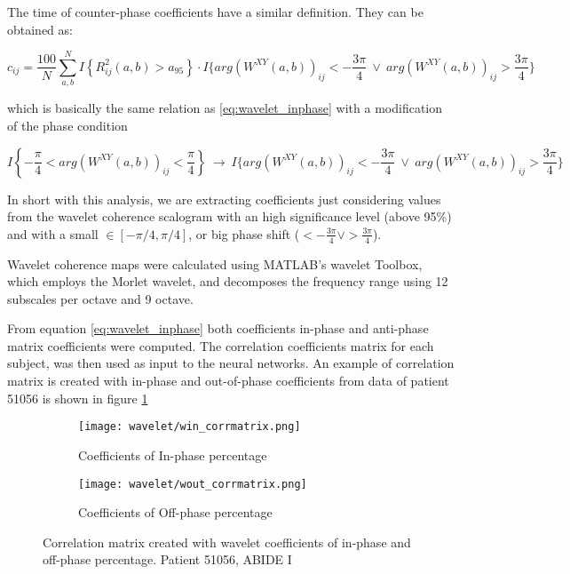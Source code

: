 \documentclass[11pt]{report}
\begin{document}
The time of counter-phase coefficients have a similar definition. They can be obtained as:

\begin{equation} \label{eq:wavelet_counterphase}
c_{ij} = \frac{100}{N}\sum_{a, b}^N I\left\{ R_{ij}^2(a,b) > a_{95}\right\} \cdot I\{arg(W^{XY}(a, b))_{ij} < -\frac{3\pi}{4} \ \lor \ arg (W^{XY}(a, b))_{ij} >\frac{3\pi}{4} \}
\end{equation}

which is basically the same relation as \ref{eq:wavelet_inphase} with a modification of the phase condition

\[
I\left\{-\frac{\pi}{4}<arg(W^{XY}(a, b))_{ij} < \frac{\pi}{4}  \right\} \ \longrightarrow \ I\{arg(W^{XY}(a, b))_{ij} < -\frac{3\pi}{4} \ \lor \ arg (W^{XY}(a, b))_{ij} >\frac{3\pi}{4} \}
\]

\hfill

\noindent In short with this analysis, we are extracting coefficients just considering values from the wavelet coherence scalogram with an high significance level (above 95\%) and with a small $\in [-\pi/4, \pi/4]$, or big phase shift ($< -\frac{3\pi}{4}  \lor  >\frac{3 \pi}{4}$).

Wavelet coherence maps were calculated using MATLAB's wavelet Toolbox, which employs the Morlet wavelet, and decomposes the frequency range using 12 subscales per octave and 9 octave.


From equation \ref{eq:wavelet_inphase} both coefficients in-phase and anti-phase matrix coefficients were computed.
The correlation coefficients matrix for each subject, was then used as input to the neural networks.
An example of correlation matrix is created with in-phase and out-of-phase coefficients from data of patient 51056 is shown in figure \ref{fig:win_wout}



\begin{figure}
\centering
\begin{subfigure}{0.45\textwidth}
\texttt{[image: wavelet/win\_corrmatrix.png]}
\caption{Coefficients of In-phase percentage}
 
\end{subfigure}
\begin{subfigure}{0.45\textwidth}
\texttt{[image: wavelet/wout\_corrmatrix.png]}
\caption{Coefficients of Off-phase percentage}
 
\end{subfigure}
\caption{Correlation matrix created with wavelet coefficients of in-phase and off-phase percentage. Patient 51056, ABIDE I }
\label{fig:win_wout}
\end{figure}
\end{document}
